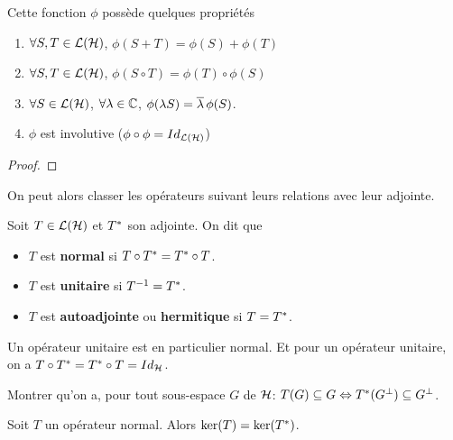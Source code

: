 Cette fonction $\phi$ possède quelques propriétés

\begin{proposition}
\begin{enumerate}
	\item $\forall S, T \in \mathcal{L}(\mathcal{H})$, $\phi(S + T) =
		\phi(S) + \phi(T)$
	\item $\forall S, T \in \mathcal{L}(\mathcal{H})$, $\phi(S \circ T) = \phi(T)
		\circ \phi(S)$
	\item $\forall S \in \mathcal{L}(\mathcal{H})$, $\forall \lambda \in
		\mathbb{C}$, $\phi(\lambda S) = \overline{\lambda} \, \phi(S)$.
	\item $\phi$ est involutive ($\phi \circ \phi =
		Id_{\mathcal{L}(\mathcal{H})}$)
\end{enumerate}
\end{proposition}

\begin{proof}
	
\end{proof}

On peut alors classer les opérateurs suivant leurs relations avec leur adjointe.

\begin{definition}
	Soit $T \in \mathcal{L}(\mathcal{H})$ et $T^{*}$ son adjointe. On
	dit que
	\begin{itemize}
		\item $T$ est \textbf{normal} si $T \circ T^{*} = T^{*}
			\circ T$.
		\item $T$ est \textbf{unitaire} si $T^{-1} = T^{*}$.
		\item $T$ est \textbf{autoadjointe} ou \textbf{hermitique} si $T =
			T^{*}$.
	\end{itemize}
\end{definition}

\begin{remarque}
	Un opérateur unitaire est en particulier normal. Et pour un opérateur
	unitaire, on a $T \circ T^{*} = T^{*} \circ T =
	Id_{\mathcal{H}}$.
\end{remarque}

\begin{exercice}
	Montrer qu'on a, pour tout sous-espace $G$ de $\mathcal{H}$:
	$T(G) \subseteq G \Leftrightarrow T^{*}(G^{\perp}) \subseteq G^{\perp}$.
\end{exercice}

\begin{exercice}
	Soit $T$ un opérateur normal. Alors $\ker(T) = \ker(T^{*})$.
\end{exercice}


